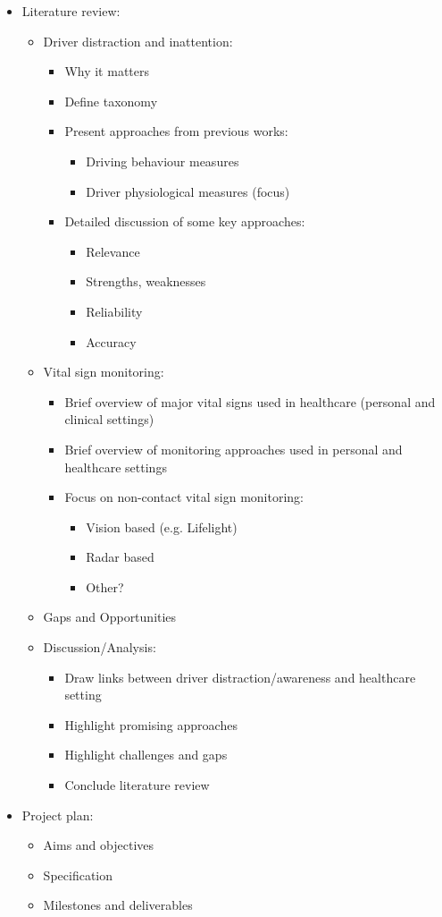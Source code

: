 \documentclass[11pt, parskip=half*,twoside=false]{scrbook}
\begin{document}
\begin{itemize}
	\item Literature review:
	\begin{itemize}
		\item Driver distraction and inattention:
		\begin{itemize}
			\item Why it matters
			\item Define taxonomy
			\item Present approaches from previous works:
			\begin{itemize}
				\item Driving behaviour measures
				\item Driver physiological measures (focus)
			\end{itemize}
			\item Detailed discussion of some key approaches:
			\begin{itemize}
				\item Relevance
				\item Strengths, weaknesses
				\item Reliability
				\item Accuracy
			\end{itemize}
		\end{itemize}
		\item Vital sign monitoring:
		\begin{itemize}
			\item Brief overview of major vital signs used in healthcare (personal and clinical settings)
			\item Brief overview of monitoring approaches used in personal and healthcare settings
			\item Focus on non-contact vital sign monitoring:
			\begin{itemize}
				\item Vision based (e.g. Lifelight)
				\item Radar based
				\item Other?
			\end{itemize}
		\end{itemize}
		\item Gaps and Opportunities
		\item Discussion/Analysis:
			\begin{itemize}
				\item Draw links between driver distraction/awareness and healthcare setting
				\item Highlight promising approaches
				\item Highlight challenges and gaps
				\item Conclude literature review
			\end{itemize}
		\end{itemize} 
	\item Project plan:
	\begin{itemize}
		\item Aims and objectives
		\item Specification
		\item Milestones and deliverables
	\end{itemize}
\end{itemize}
\end{document}
